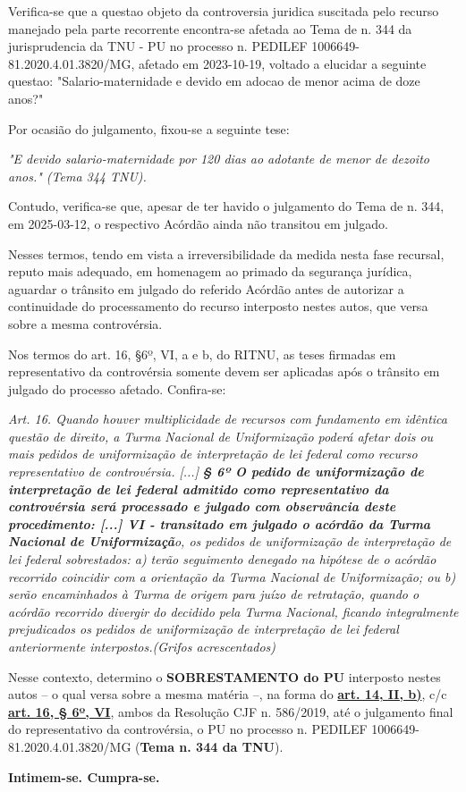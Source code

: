 \documentclass[12pt]{article}
\begin{document}
\justifying
\noindent Verifica-se que a questao objeto da controversia juridica suscitada pelo recurso manejado pela parte recorrente encontra-se afetada ao Tema de n. 344 da jurisprudencia da TNU - PU no processo n. PEDILEF 1006649-81.2020.4.01.3820/MG, afetado em 2023-10-19, voltado a elucidar a seguinte questao: "Salario-maternidade e devido em adocao de menor acima de doze anos?"

\noindent Por ocasião do julgamento, fixou-se a seguinte tese:

\noindent \textit{"E devido salario-maternidade por 120 dias ao adotante de menor de dezoito anos." (Tema 344 TNU).}

\noindent Contudo, verifica-se que, apesar de ter havido o julgamento do Tema de n. 344, em 2025-03-12, o respectivo Acórdão ainda não transitou em julgado.

\noindent Nesses termos, tendo em vista a irreversibilidade da medida nesta fase recursal, reputo mais adequado, em homenagem ao primado da segurança jurídica, aguardar o trânsito em julgado do referido Acórdão antes de autorizar a continuidade do processamento do recurso interposto nestes autos, que versa sobre a mesma controvérsia.

\noindent Nos termos do art. 16, §6º, VI, a e b,  do RITNU, as teses firmadas em representativo da controvérsia somente devem ser aplicadas após o trânsito em julgado do processo afetado. Confira-se:

\noindent \textit{Art. 16. Quando houver multiplicidade de recursos com fundamento em idêntica questão de direito, a Turma Nacional de Uniformização poderá afetar dois ou mais pedidos de uniformização de interpretação de lei federal como recurso representativo de controvérsia. [...] }\textit{\textbf{§ 6º O pedido de uniformização de interpretação de lei federal admitido como representativo da controvérsia será processado e julgado com observância deste procedimento: [...] VI - transitado em julgado o acórdão da Turma Nacional de Uniformizaçã}}\textit{o, os pedidos de uniformização de interpretação de lei federal sobrestados: a) terão seguimento denegado na hipótese de o acórdão recorrido coincidir com a orientação da Turma Nacional de Uniformização; ou b) serão encaminhados à Turma de origem para juízo de retratação, quando o acórdão recorrido divergir do decidido pela Turma Nacional, ficando integralmente prejudicados os pedidos de uniformização de interpretação de lei federal anteriormente interpostos.(Grifos acrescentados)}

\noindent Nesse contexto, determino o \textbf{SOBRESTAMENTO do PU} interposto nestes autos – o qual versa sobre a mesma matéria –, na forma do \uline{\textbf{art. 14, II, b)}},\textbf{ }c/c\textbf{ }\uline{\textbf{art. 16, § 6º, VI}}, ambos da Resolução CJF n. 586/2019, até o julgamento final do representativo da controvérsia, o PU no processo n. PEDILEF 1006649-81.2020.4.01.3820/MG (\textbf{Tema n. 344 da TNU}).

\noindent \textbf{Intimem-se. Cumpra-se.}
\end{document}
